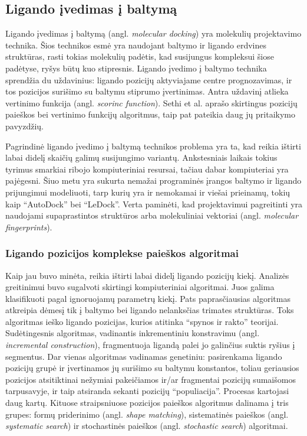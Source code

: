 \subsection{Ligando įvedimas į baltymą}

Ligando įvedimas į baltymą (angl. \textit{molecular docking}) yra molekulių projektavimo technika. Šios technikos esmė yra naudojant baltymo ir ligando erdvines struktūras, rasti tokias molekulių padėtis, kad susijungus kompleksui šiose padėtyse, ryšys būtų kuo stipresnis. Ligando įvedimo į baltymo technika sprendžia du uždavinius: ligando pozicijų aktyviajame centre prognozavimas, ir tos pozicijos surišimo su baltymu stiprumo įvertinimas.\cite{ain_machine-learning_2015}\cite{ballester_does_2014} Antra uždavinį atlieka vertinimo funkcija (angl. \textit{scorinc function}).\cite{berry_practical_2015} Sethi et al.\cite{sethi_molecular_2019} aprašo skirtingus pozicijų paieškos bei vertinimo funkcijų algoritmus, taip pat pateikia daug jų pritaikymo pavyzdžių.

Pagrindinė ligando įvedimo į baltymą technikos problema yra ta, kad reikia ištirti labai didelį skaičių galimų susijungimo variantų.\cite{huang_advances_2010} Ankstesniais laikais tokius tyrimus smarkiai ribojo kompiuteriniai resursai, tačiau dabar kompiuteriai yra pajėgesni. Šiuo metu yra sukurta nemažai programinės įrangos baltymo ir ligando prijungimui modeliuoti, tarp kurių yra ir nemokamai ir viešai prieinamų, tokių kaip \enquote{AutoDock} bei \enquote{LeDock}.\cite{wang_comprehensive_2016} Verta paminėti, kad projektavimui pagreitinti yra naudojami supaprastintos struktūros arba molekuliniai vektoriai (angl. \textit{molecular fingerprints}).\cite{ballester_does_2014}

\subsubsection{Ligando pozicijos komplekse paieškos algoritmai}

Kaip jau buvo minėta, reikia ištirti labai didelį ligando pozicijų kiekį. Analizės greitinimui buvo sugalvoti skirtingi kompiuteriniai algoritmai. Juos galima klasifikuoti pagal ignoruojamų parametrų kiekį. Pats paprasčiausias algoritmas atkreipia dėmesį tik į baltymo bei ligando nelanksčias trimates struktūras. Toks algoritmas ieško ligando pozicijas, kurios atitinka \enquote{spynos ir rakto} teorijai.\cite{du_insights_2016} Sudėtingesnis algoritmas, vadinantis inkrementiniu konstravimu (angl. \textit{incremental construction}), fragmentuoja ligandą palei jo galinčius suktis ryšius į segmentus.\cite{huang_advances_2010} Dar vienas algoritmas vadinamas genetiniu: pasirenkama ligando pozicijų grupė ir įvertinamos jų surišimo su baltymu konstantos, toliau geriausios pozicijos atsitiktinai nežymiai pakeičiamos ir/ar fragmentai pozicijų sumaišomos tarpusavyje, ir taip atsiranda sekanti pozicijų \enquote{populiacija}. Procesas kartojasi daug kartų. Kituose straipsniuose\cite{huang_advances_2010}\cite{wang_comprehensive_2016} pozicijos paieškos algoritmus dalinama į tris grupes: formų priderinimo (angl. \textit{shape matching}), sistematinės paieškos (angl. \textit{systematic search}) ir stochastinės paieškos (angl. \textit{stochastic search}) algoritmai.

